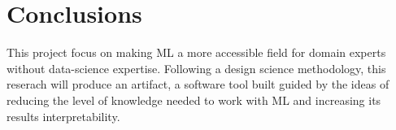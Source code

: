\documentclass[runningheads]{llncs}
\begin{document}
\section{Conclusions}

This project focus on making ML a more accessible field for domain experts without data-science expertise. 
 Following a design science methodology, this reserach will produce an artifact, a software tool built guided by the ideas of reducing the level of knowledge needed to work with ML and increasing its results interpretability. 

%
%
%


\end{document}
